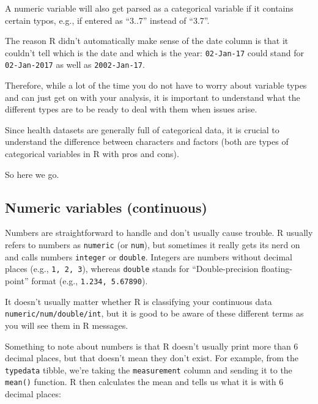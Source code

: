 \documentclass[
  12pt,
  krantz2]{krantz}
\renewenvironment{quote}{\begin{VF}}{\end{VF}}
\begin{document}
A numeric variable will also get parsed as a categorical variable if it contains certain typos, e.g., if entered as ``3..7'' instead of ``3.7''.

The reason R didn't automatically make sense of the date column is that it couldn't tell which is the date and which is the year: \texttt{02-Jan-17} could stand for \texttt{02-Jan-2017} as well as \texttt{2002-Jan-17}.

Therefore, while a lot of the time you do not have to worry about variable types and can just get on with your analysis, it is important to understand what the different types are to be ready to deal with them when issues arise.

\begin{quote}
Since health datasets are generally full of categorical data, it is crucial to understand the difference between characters and factors (both are types of categorical variables in R with pros and cons).
\end{quote}

So here we go.

\hypertarget{numeric-variables-continuous}{%
\subsection{Numeric variables (continuous)}\label{numeric-variables-continuous}}


Numbers are straightforward to handle and don't usually cause trouble.
R usually refers to numbers as \texttt{numeric} (or \texttt{num}), but sometimes it really gets its nerd on and calls numbers \texttt{integer} or \texttt{double}.
Integers are numbers without decimal places (e.g., \texttt{1,\ 2,\ 3}), whereas \texttt{double} stands for ``Double-precision floating-point'' format (e.g., \texttt{1.234,\ 5.67890}).

It doesn't usually matter whether R is classifying your continuous data \texttt{numeric/num/double/int}, but it is good to be aware of these different terms as you will see them in R messages.

Something to note about numbers is that R doesn't usually print more than 6 decimal places, but that doesn't mean they don't exist.
For example, from the \texttt{typedata} tibble, we're taking the \texttt{measurement} column and sending it to the \texttt{mean()} function.
R then calculates the mean and tells us what it is with 6 decimal places:
\end{document}
